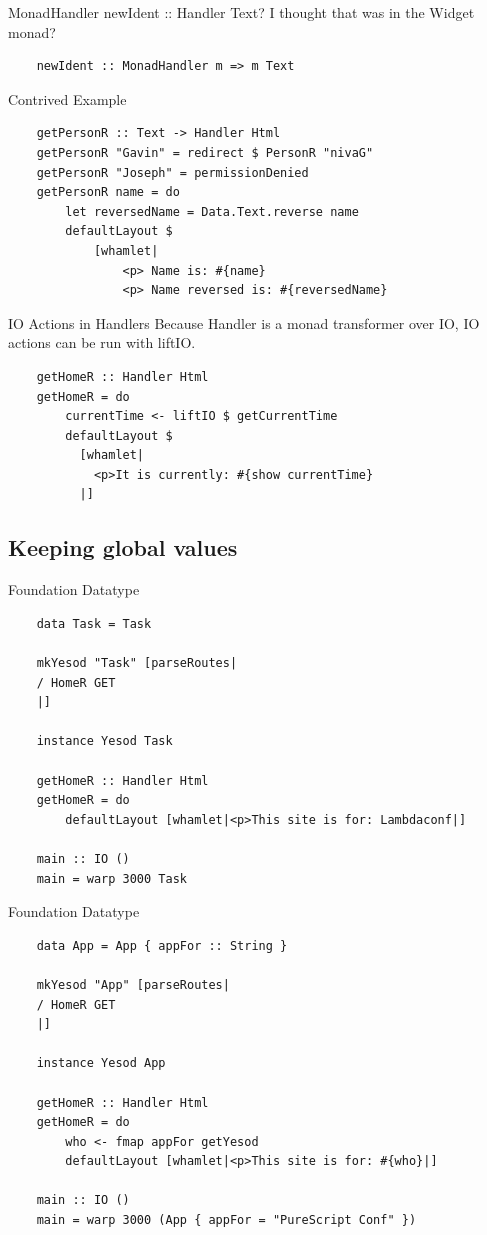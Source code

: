 \documentclass[pdf]{beamer}
\begin{document}
\begin{frame}[fragile]{MonadHandler}
  newIdent :: Handler Text? I thought that was in the Widget monad?
  \pause
  \begin{verbatim}
    newIdent :: MonadHandler m => m Text
  \end{verbatim}
\end{frame}

\begin{frame}[fragile]{Contrived Example}
  \begin{verbatim}
    getPersonR :: Text -> Handler Html
    getPersonR "Gavin" = redirect $ PersonR "nivaG"
    getPersonR "Joseph" = permissionDenied
    getPersonR name = do
        let reversedName = Data.Text.reverse name
        defaultLayout $
            [whamlet|
                <p> Name is: #{name}
                <p> Name reversed is: #{reversedName}
  \end{verbatim}
\end{frame}

\begin{frame}[fragile]{IO Actions in Handlers}
  Because Handler is a monad transformer over IO, IO actions can be
  run with liftIO.
  \begin{verbatim}
    getHomeR :: Handler Html
    getHomeR = do
        currentTime <- liftIO $ getCurrentTime
        defaultLayout $
          [whamlet|
            <p>It is currently: #{show currentTime}
          |]
  \end{verbatim}
\end{frame}

\subsection{Keeping global values}
\begin{frame}[fragile]{Foundation Datatype}
  \begin{verbatim}
    data Task = Task

    mkYesod "Task" [parseRoutes|
    / HomeR GET
    |]

    instance Yesod Task

    getHomeR :: Handler Html
    getHomeR = do
        defaultLayout [whamlet|<p>This site is for: Lambdaconf|]

    main :: IO ()
    main = warp 3000 Task
  \end{verbatim}
\end{frame}

\begin{frame}[fragile]{Foundation Datatype}
  \begin{verbatim}
    data App = App { appFor :: String }

    mkYesod "App" [parseRoutes|
    / HomeR GET
    |]

    instance Yesod App

    getHomeR :: Handler Html
    getHomeR = do
        who <- fmap appFor getYesod
        defaultLayout [whamlet|<p>This site is for: #{who}|]

    main :: IO ()
    main = warp 3000 (App { appFor = "PureScript Conf" })
  \end{verbatim}
\end{frame}
\end{document}
